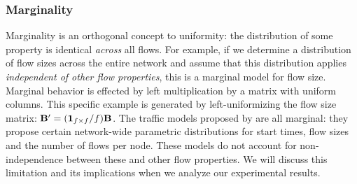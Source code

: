 \documentclass[twocolumn,final]{svjour3}
\begin{document}

\subsubsection{Marginality}

Marginality is an orthogonal concept to uniformity: the distribution of some property is identical \textit{across} all flows. For example, if we determine a distribution of flow sizes across the entire network and assume that this distribution applies \textit{independent of other flow properties}, this is a marginal model for flow size. Marginal behavior is effected by left multiplication by a matrix with uniform columns. This specific example is generated by left-uniformizing the flow size matrix: $\mathbf{B}' = (\mathbf{1}_{f \times f}/f)\mathbf{B}$.
The traffic models proposed by {\FHC} are all marginal: they propose certain network-wide parametric distributions for start times, flow sizes and the number of flows per node. These models do not account for non-independence between these and other flow properties. We will discuss this limitation and its implications when we analyze our experimental results.
\end{document}
